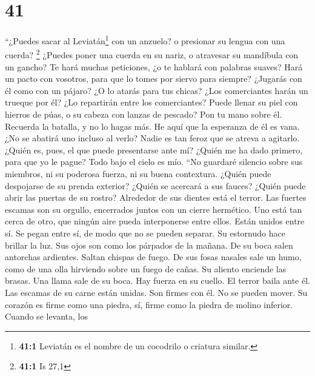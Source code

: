 \hypertarget{section-40}{%
\section{41}\label{section-40}}

 ``¿Puedes sacar al Leviatán\footnote{\textbf{41:1}
  Leviatán es el nombre de un cocodrilo o criatura similar.} con un
anzuelo? o presionar su lengua con una cuerda? \footnote{\textbf{41:1}
  Is 27,1}  ¿Puedes poner una cuerda en su nariz, o
atravesar su mandíbula con un gancho?  Te hará muchas
peticiones, ¿o te hablará con palabras suaves?  Hará un
pacto con vosotros, para que lo tomes por siervo para siempre?
 ¿Jugarás con él como con un pájaro? ¿O lo atarás para tus
chicas?  ¿Los comerciantes harán un trueque por él? ¿Lo
repartirán entre los comerciantes?  Puede llenar su piel
con hierros de púas, o su cabeza con lanzas de pescado? 
Pon tu mano sobre él. Recuerda la batalla, y no lo hagas más.
 He aquí que la esperanza de él es vana. ¿No se abatirá
uno incluso al verlo?  Nadie es tan feroz que se atreva a
agitarlo. ¿Quién es, pues, el que puede presentarse ante mí?
 ¿Quién me ha dado primero, para que yo le pague? Todo
bajo el cielo es mío.  ``No guardaré silencio sobre sus
miembros, ni su poderosa fuerza, ni su buena contextura. 
¿Quién puede despojarse de su prenda exterior? ¿Quién se acercará a sus
fauces?  ¿Quién puede abrir las puertas de su rostro?
Alrededor de sus dientes está el terror.  Las fuertes
escamas son su orgullo, encerrados juntos con un cierre hermético.
 Uno está tan cerca de otro, que ningún aire pueda
interponerse entre ellos.  Están unidos entre sí. Se
pegan entre sí, de modo que no se pueden separar.  Su
estornudo hace brillar la luz. Sus ojos son como los párpados de la
mañana.  De su boca salen antorchas ardientes. Saltan
chispas de fuego.  De sus fosas nasales sale un humo,
como de una olla hirviendo sobre un fuego de cañas.  Su
aliento enciende las brasas. Una llama sale de su boca. 
Hay fuerza en su cuello. El terror baila ante él.  Las
escamas de su carne están unidas. Son firmes con él. No se pueden mover.
 Su corazón es firme como una piedra, sí, firme como la
piedra de molino inferior.  Cuando se levanta, los
